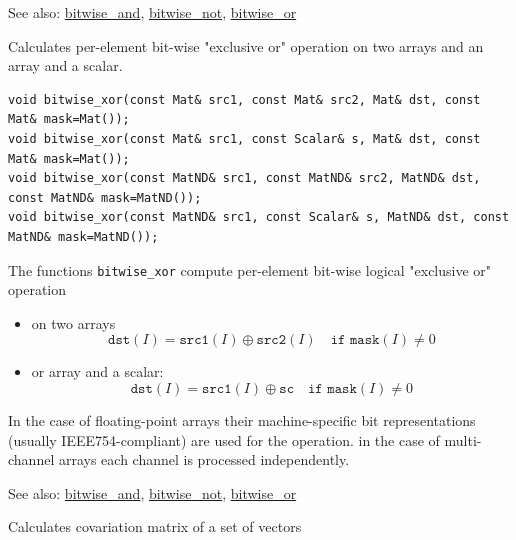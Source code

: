 See also: \hyperref[bitwise.and]{bitwise\_and}, \hyperref[bitwise.not]{bitwise\_not}, \hyperref[bitwise.or]{bitwise\_or}

Calculates per-element bit-wise "exclusive or" operation on two arrays and an array and a scalar.

\begin{lstlisting}
void bitwise_xor(const Mat& src1, const Mat& src2, Mat& dst, const Mat& mask=Mat());
void bitwise_xor(const Mat& src1, const Scalar& s, Mat& dst, const Mat& mask=Mat());
void bitwise_xor(const MatND& src1, const MatND& src2, MatND& dst, const MatND& mask=MatND());
void bitwise_xor(const MatND& src1, const Scalar& s, MatND& dst, const MatND& mask=MatND());
\end{lstlisting}
\begin{description}
\end{description}

The functions \texttt{bitwise\_xor} compute per-element bit-wise logical "exclusive or" operation

\begin{itemize}
    \item on two arrays
    \[\texttt{dst}(I) = \texttt{src1}(I) \oplus \texttt{src2}(I)\quad\texttt{if mask}(I)\ne0\]
    \item or array and a scalar:
    \[\texttt{dst}(I) = \texttt{src1}(I) \oplus \texttt{sc}\quad\texttt{if mask}(I)\ne0\]
\end{itemize}

In the case of floating-point arrays their machine-specific bit representations (usually IEEE754-compliant) are used for the operation. in the case of multi-channel arrays each channel is processed independently.

See also: \hyperref[bitwise.and]{bitwise\_and}, \hyperref[bitwise.not]{bitwise\_not}, \hyperref[bitwise.or]{bitwise\_or}

\label{calcCovarMatrix}
Calculates covariation matrix of a set of vectors

